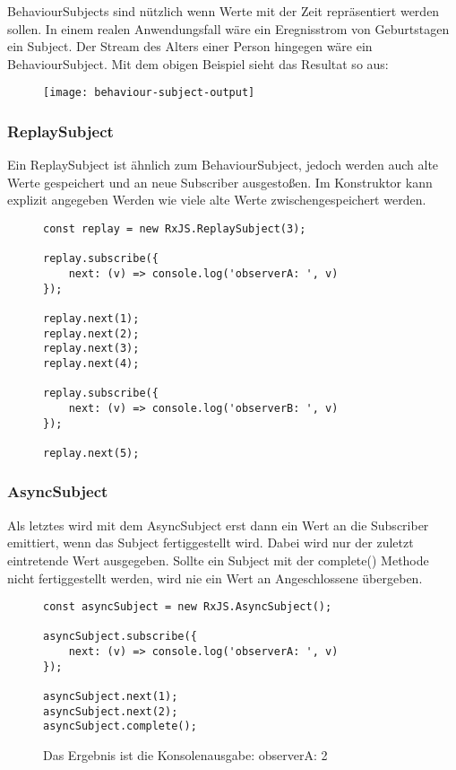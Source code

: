 \noindent
BehaviourSubjects sind nützlich wenn Werte mit der Zeit repräsentiert werden sollen. In einem realen Anwendungsfall wäre ein Eregnisstrom von Geburtstagen ein Subject. Der Stream des Alters einer Person hingegen wäre ein BehaviourSubject. Mit dem obigen Beispiel sieht das Resultat so aus:

\begin{figure}[H]
\centering
\texttt{[image: behaviour-subject-output]}
\end{figure}

\subsubsection{ReplaySubject}
Ein ReplaySubject ist ähnlich zum BehaviourSubject, jedoch werden auch alte Werte gespeichert und an neue Subscriber ausgestoßen. Im Konstruktor kann explizit angegeben Werden wie viele alte Werte zwischengespeichert werden.

\begin{figure}[H]
\begin{lstlisting}[basicstyle=\small]
const replay = new RxJS.ReplaySubject(3);

replay.subscribe({
    next: (v) => console.log('observerA: ', v)
});

replay.next(1);
replay.next(2);
replay.next(3);
replay.next(4);

replay.subscribe({
    next: (v) => console.log('observerB: ', v)
});

replay.next(5);
\end{lstlisting}
\end{figure}

\subsubsection{AsyncSubject}
Als letztes wird mit dem AsyncSubject erst dann ein Wert an die Subscriber emittiert, wenn das Subject fertiggestellt wird. Dabei wird nur der zuletzt eintretende Wert ausgegeben. Sollte ein Subject mit der complete() Methode nicht fertiggestellt werden, wird nie ein Wert an Angeschlossene übergeben.

\begin{figure}[H]
\begin{lstlisting}[basicstyle=\small]
const asyncSubject = new RxJS.AsyncSubject();

asyncSubject.subscribe({
    next: (v) => console.log('observerA: ', v)
});

asyncSubject.next(1);
asyncSubject.next(2);
asyncSubject.complete();
\end{lstlisting}
\caption{Das Ergebnis ist die Konsolenausgabe: \glqq observerA:  2 \grqq{}}
\end{figure}

